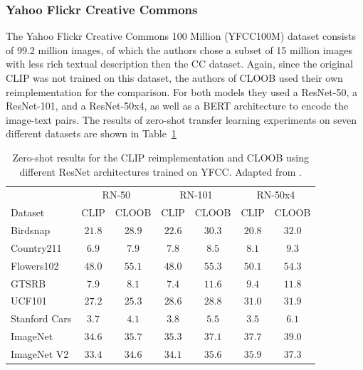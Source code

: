 \documentclass{scrarticle}
\begin{document}
\subsubsection{Yahoo Flickr Creative Commons}

The Yahoo Flickr Creative Commons 100 Million (YFCC100M) dataset \cite{yfcc} consists of 99.2 million images, of which the authors chose a subset of 15 million images with less rich textual description then the CC dataset. Again, since the original CLIP was not trained on this dataset, the authors of CLOOB used their own reimplementation for the comparison. For both models they used a ResNet-50, a ResNet-101, and a ResNet-50x4, as well as a BERT architecture to encode the image-text pairs. The results of zero-shot transfer learning experiments on seven different
datasets are shown in Table~\ref{table:yfcc}

\begin{table}[H]
    \begin{center}
        \begin{tabular}{l | c c | c c | c c }
&\multicolumn{2}{|c|}{RN-50}    &\multicolumn{2}{|c|}{RN-101}   &\multicolumn{2}{|c}{RN-50x4}  \\
Dataset         &CLIP   &CLOOB  &CLIP   &CLOOB  &CLIP   &CLOOB  \\
\hline
Birdsnap        &$21.8$             &$\mathbf{28.9}$    &$22.6$ &$\mathbf{30.3}$    &$20.8$ &$\mathbf{32.0}$    \\
Country211      &$6.9$              &$\mathbf{7.9}$     &$7.8$  &$\mathbf{8.5}$     &$8.1$  &$\mathbf{9.3}$     \\
Flowers102      &$48.0$             &$\mathbf{55.1}$    &$48.0$ &$\mathbf{55.3}$    &$50.1$ &$\mathbf{54.3}$    \\
GTSRB           &$7.9$              &$\mathbf{8.1}$     &$7.4$  &$\mathbf{11.6}$    &$9.4$  &$\mathbf{11.8}$    \\
UCF101          &$\mathbf{27.2}$    &$25.3$             &$28.6$ &$\mathbf{28.8}$    &$31.0$ &$\mathbf{31.9}$    \\
Stanford Cars   &$3.7$              &$\mathbf{4.1}$     &$3.8$  &$\mathbf{5.5}$     &$3.5$  &$\mathbf{6.1}$     \\
ImageNet        &$34.6$             &$\mathbf{35.7}$    &$35.3$ &$\mathbf{37.1}$    &$37.7$ &$\mathbf{39.0}$    \\
ImageNet V2     &$33.4$             &$\mathbf{34.6}$    &$34.1$ &$\mathbf{35.6}$    &$35.9$ &$\mathbf{37.3}$    \\
        \end{tabular}
    \end{center}
    \caption{Zero-shot results for the CLIP reimplementation and CLOOB using different ResNet architectures trained on YFCC. Adapted from \citet{cloob}.}
    \label{table:yfcc}
\end{table}
\end{document}
